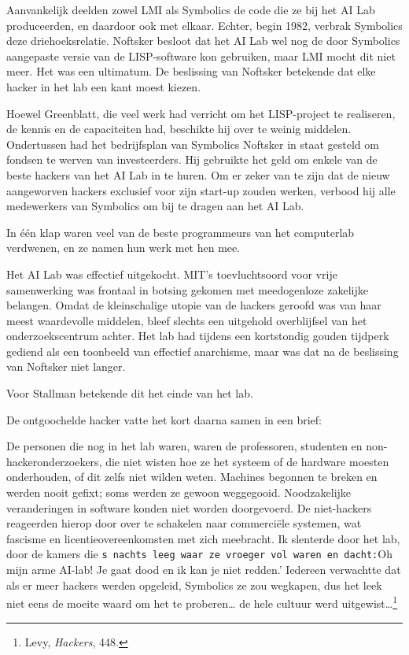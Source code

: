 \documentclass[
  a5paper,
  smalldemyvopaper,11pt,twoside,onecolumn,openright,extrafontsizes,
hidelinks]{memoir}
\renewenvironment{quote}%
               {\list{}{\rightmargin=.3cm\leftmargin=.3cm}%
                \itshape \item[]}%
               {\endlist}
\begin{document}
Aanvankelijk deelden zowel LMI als Symbolics de code die ze bij het AI
Lab produceerden, en daardoor ook met elkaar. Echter, begin 1982,
verbrak Symbolics deze driehoeksrelatie. Noftsker besloot dat het AI Lab
wel nog de door Symbolics aangepaste versie van de LISP-software kon
gebruiken, maar LMI mocht dit niet meer. Het was een ultimatum. De
beslissing van Noftsker betekende dat elke hacker in het lab een kant
moest kiezen.

Hoewel Greenblatt, die veel werk had verricht om het LISP-project te
realiseren, de kennis en de capaciteiten had, beschikte hij over te
weinig middelen. Ondertussen had het bedrijfsplan van Symbolics Noftsker
in staat gesteld om fondsen te werven van investeerders. Hij gebruikte
het geld om enkele van de beste hackers van het AI Lab in te huren. Om
er zeker van te zijn dat de nieuw aangeworven hackers exclusief voor
zijn start-up zouden werken, verbood hij alle medewerkers van Symbolics
om bij te dragen aan het AI Lab.

In één klap waren veel van de beste programmeurs van het computerlab
verdwenen, en ze namen hun werk met hen mee.

Het AI Lab was effectief uitgekocht. MIT's toevluchtsoord voor vrije
samenwerking was frontaal in botsing gekomen met meedogenloze zakelijke
belangen. Omdat de kleinschalige utopie van de hackers geroofd was van
haar meest waardevolle middelen, bleef slechts een uitgehold
overblijfsel van het onderzoekscentrum achter. Het lab had tijdens een
kortstondig gouden tijdperk gediend als een toonbeeld van effectief
anarchisme, maar was dat na de beslissing van Noftsker niet langer.

Voor Stallman betekende dit het einde van het lab.

De ontgoochelde hacker vatte het kort daarna samen in een brief:

\begin{quote}
De personen die nog in het lab waren, waren de professoren, studenten en
non-hackeronderzoekers, die niet wisten hoe ze het systeem of de
hardware moesten onderhouden, of dit zelfs niet wilden weten. Machines
begonnen te breken en werden nooit gefixt; soms werden ze gewoon
weggegooid. Noodzakelijke veranderingen in software konden niet worden
doorgevoerd. De niet-hackers reageerden hierop door over te schakelen
naar commerciële systemen, wat fascisme en licentieovereenkomsten met
zich meebracht. Ik slenterde door het lab, door de kamers die
\texttt{s\ nachts\ leeg\ waar\ ze\ vroeger\ vol\ waren\ en\ dacht:}Oh
mijn arme AI-lab! Je gaat dood en ik kan je niet redden.' Iedereen
verwachtte dat als er meer hackers werden opgeleid, Symbolics ze zou
wegkapen, dus het leek niet eens de moeite waard om het te
proberen\ldots{} de hele cultuur werd uitgewist\ldots{}\footnote{\hspace{0pt}Levy,
  \emph{Hackers}, 448.}
\end{quote}
\end{document}
